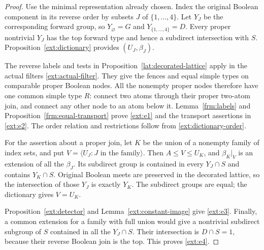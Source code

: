 \begin{proof}
Use the minimal representation already chosen.  Index the original
Boolean component in its reverse order by subsets $J$ of
$\{1,\ldots,4\}$.  Let $Y_J$ be the corresponding forward group, so
$Y_\varnothing=G$ and $Y_{\{1,\ldots,4\}}=D$.
Every proper nontrivial $Y_J$ has the top forward type and hence a
subdirect intersection with $S$.  Proposition~\ref{ext:dictionary}
provides $(U_J,\beta_J)$.

The reverse labels and tests in
Proposition~\ref{lat:decorated-lattice} apply in the actual filters
\eqref{ext:actual-filter}.  They give the fences and equal simple types
on comparable proper Boolean nodes.  All the nonempty proper nodes
therefore have one common simple type $R$: connect two atoms through
their proper two-atom join, and connect any other node to an atom below
it.  Lemma~\ref{frm:labels} and Proposition~\ref{frm:equal-transport} prove
\ref{ext:e1} and the transport assertions in \ref{ext:e2}.
The order relation and restrictions follow from
\eqref{ext:dictionary-order}.

For the assertion about a proper join, let $K$ be the union of a
nonempty family of index sets, and put
$V=\langle U_J:J\text{ in the family}\rangle$.
Then $A\le V\le U_K$, and $\beta_K|_V$ is an extension of all the
$\beta_J$.  Its subdirect group is contained in every $Y_J\cap S$
and contains $Y_K\cap S$.  Original Boolean meets are preserved in the
decorated lattice, so the intersection of those $Y_J$ is exactly
$Y_K$.  The subdirect groups are equal; the dictionary gives $V=U_K$.

Proposition~\ref{ext:detector} and Lemma~\ref{ext:constant-image} give
\ref{ext:e3}.  Finally, a common extension for a family with full union
would give a nontrivial subdirect subgroup of $S$ contained in all the
$Y_J\cap S$.  Their intersection is $D\cap S=1$, because their reverse
Boolean join is the top.  This proves \ref{ext:e4}.
\end{proof}
